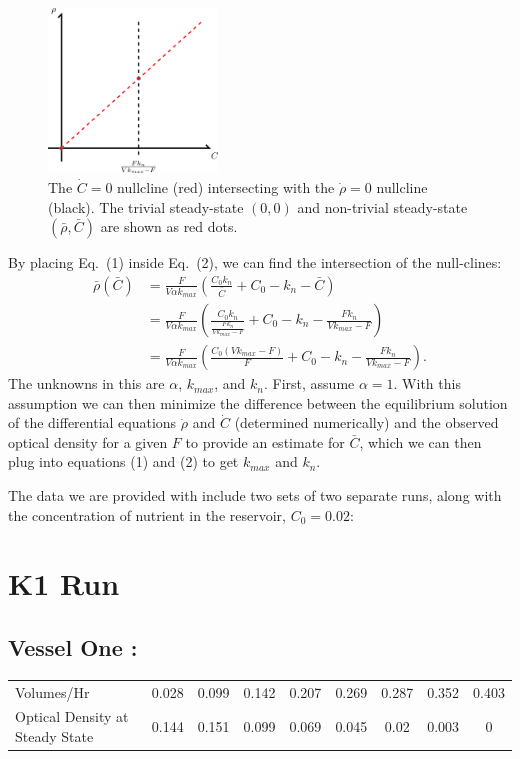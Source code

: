\begin{multicols}{2}
\begin{figure}[H]
  \centering
    \includegraphics[width=0.40\textwidth]{images/drawing.png}
  \caption{\footnotesize The $\dot{C} = 0$ nullcline (red) intersecting with the $\dot{\rho} = 0$ nullcline (black).  The trivial steady-state $(0,0)$ and non-trivial steady-state $(\bar{\rho}, \bar{C})$ are shown as red dots.}
\end{figure}
\vfill
\columnbreak
By placing Eq.\ (1) inside Eq.\ (2), we can find the intersection of the null-clines:
\scriptsize
\begin{align*}
  \bar{\rho}(\bar{C}) &= \frac{F}{V \alpha k_{max}} \left( \frac{C_0 k_n}{\bar{C}} + C_0 - k_n - \bar{C} \right) \\
  &= \frac{F}{V \alpha k_{max}} \left( \frac{C_0 k_n}{\frac{F k_n}{V k_{max} - F}} + C_0 - k_n - \frac{F k_n}{V k_{max} - F} \right) \\
  &= \frac{F}{V \alpha k_{max}} \left( \frac{C_0(V k_{max} - F)}{F} + C_0 - k_n - \frac{F k_n}{V k_{max} - F} \right).
\end{align*}
\small
The unknowns in this are $\alpha$, $k_{max}$, and $k_n$.  First, assume $\alpha = 1$.  With this assumption we can then minimize the difference between the equilibrium solution of the differential equations $\dot{\rho}$ and $\dot{C}$ (determined numerically) and the observed optical density for a given $F$ to provide an estimate for $\bar{C}$, which we can then plug into equations (1) and (2) to get $k_{max}$ and $k_n$.
\end{multicols}

The data we are provided with include two sets of two separate runs, along with the concentration of nutrient in the reservoir, $C_0 = 0.02$:
\section{K1 Run}
\subsection*{Vessel One :}
\begin{center}
\begin{tabular}{l|cccccccc}
  Volumes/Hr & 0.028 & 0.099 & 0.142 & 0.207 & 0.269 & 0.287 & 0.352 & 0.403 \\
  Optical Density at Steady State & 0.144 & 0.151 & 0.099 & 0.069 & 0.045 & 0.02 & 0.003 & 0 \\
\end{tabular}
\end{center}

